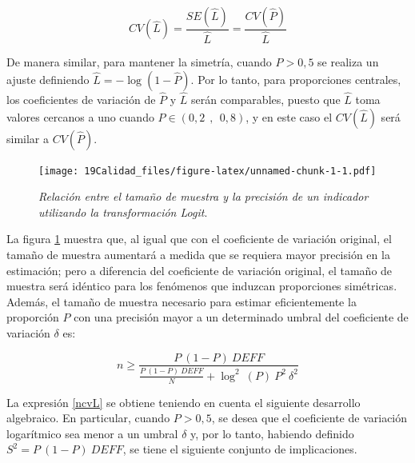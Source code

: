 \documentclass[
  10pt,
  spanish,
]{book}
\begin{document}
\[
CV(\hat{L}) = \dfrac{SE(\hat{L})}{\hat{L}} = \dfrac{CV(\hat{P})}{\hat{L}}
\]

De manera similar, para mantener la simetría, cuando \(P>0,5\) se realiza un ajuste definiendo \(\hat{L} = -\log(1-\hat{P})\). Por lo tanto, para proporciones centrales, los coeficientes de variación de \(\hat{P}\) y \(\hat{L}\) serán comparables, puesto que \(\hat{L}\) toma valores cercanos a uno cuando \(P \in (0,2\ \ ,\ \ 0,8)\), y en este caso el \(CV(\hat{L})\) será similar a \(CV(\hat{P})\).

\begin{figure}
\centering
\texttt{[image: 19Calidad\_files/figure-latex/unnamed-chunk-1-1.pdf]}
\caption{\label{fig:unnamed-chunk-1}\label{fig1}\emph{Relación entre el tamaño de muestra y la precisión de un indicador utilizando la transformación Logit}.}
\end{figure}

La figura \ref{fig1} muestra que, al igual que con el coeficiente de variación original, el tamaño de muestra aumentará a medida que se requiera mayor precisión en la estimación; pero a diferencia del coeficiente de variación original, el tamaño de muestra será idéntico para los fenómenos que induzcan proporciones simétricas. Además, el tamaño de muestra necesario para estimar eficientemente la proporción \(P\) con una precisión mayor a un determinado umbral del coeficiente de variación \(\delta\) es:

\begin{equation}
\label{ncvL}
n \geq \dfrac{P \ (1-P) \  DEFF}{\frac{P \  (1-P) \ DEFF}{N}+\log^2\ (P) \ P^2 \ \delta^2}
\end{equation}

La expresión \eqref{ncvL} se obtiene teniendo en cuenta el siguiente desarrollo algebraico. En particular, cuando \(P > 0,5\), se desea que el coeficiente de variación logarítmico sea menor a un umbral \(\delta\) y, por lo tanto, habiendo definido \(S^2 = P\ (1-P) \  DEFF\), se tiene el siguiente conjunto de implicaciones.
\end{document}
